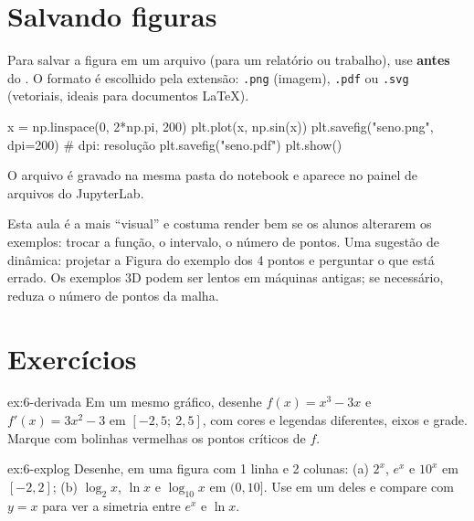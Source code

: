 \section{Salvando figuras}

Para salvar a figura em um arquivo (para um relatório ou trabalho), use  \textbf{antes} do
. O formato é escolhido pela extensão: \texttt{.png} (imagem), \texttt{.pdf} ou \texttt{.svg}
(vetoriais, ideais para documentos \LaTeX).

\begin{codigo}
x = np.linspace(0, 2*np.pi, 200)
plt.plot(x, np.sin(x))
plt.savefig("seno.png", dpi=200)     # dpi: resolução
plt.savefig("seno.pdf")
plt.show()
\end{codigo}

O arquivo é gravado na mesma pasta do notebook e aparece no painel de arquivos do JupyterLab.

\begin{professor}
Esta aula é a mais ``visual'' e costuma render bem se os alunos alterarem os exemplos: trocar a função, o
intervalo, o número de pontos. Uma sugestão de dinâmica: projetar a Figura do exemplo dos 4 pontos e perguntar o
que está errado. Os exemplos 3D podem ser lentos em máquinas antigas; se necessário, reduza o número de pontos da
malha.
\end{professor}

\section{Exercícios}

\begin{exercicio}{ex:6-derivada}
Em um mesmo gráfico, desenhe $f(x)=x^3-3x$ e $f'(x)=3x^2-3$ em $[-2{,}5;\ 2{,}5]$, com cores e legendas diferentes,
eixos e grade. Marque com bolinhas vermelhas os pontos críticos de $f$.
\end{exercicio}

\begin{exercicio}{ex:6-explog}
Desenhe, em uma figura com 1 linha e 2 colunas: (a) $2^x$, $e^x$ e $10^x$ em $[-2,2]$; (b) $\log_2 x$, $\ln x$ e
$\log_{10}x$ em $(0, 10]$. Use  em um deles e compare com $y=x$ para ver a simetria entre
$e^x$ e $\ln x$.
\end{exercicio}


